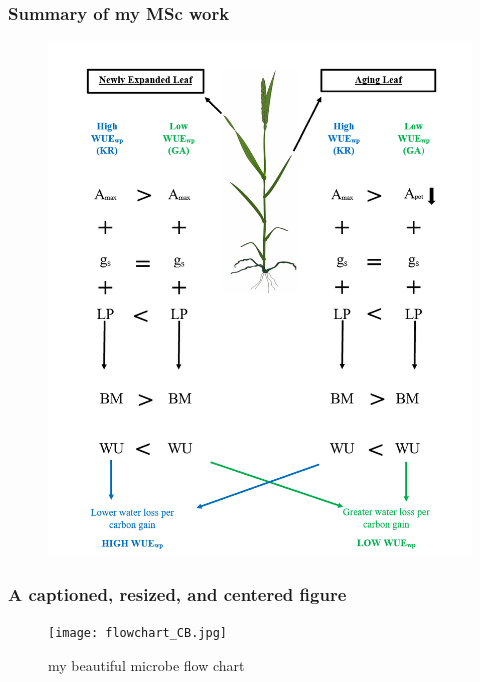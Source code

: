 \documentclass[12pt]{beamer}\usepackage[]{graphicx}\usepackage[]{color}
\begin{document}
\begin{frame}
\frametitle{Summary of my MSc work}
\begin{figure}
   \includegraphics[width=1.0\linewidth]{Thesis Summary Diagram.PNG}
\end{figure}
\end{frame}

\begin{frame}
\frametitle{A captioned, resized, and centered figure}
\begin{figure}[h!]
  \caption{my beautiful microbe flow chart}
  \texttt{[image: flowchart\_CB.jpg]}
\end{figure}
\end{frame}

\end{document}
